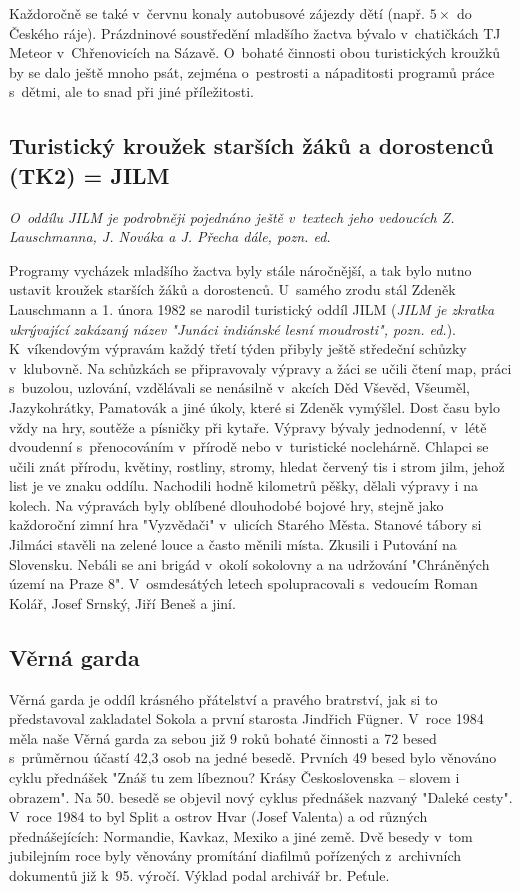 \documentclass[a5paper, 11pt, twoside]{article}
\newcommand{\pozned}[1]{%
\textit{#1}}
\begin{document}
Každoročně se také v~červnu konaly autobusové zájezdy dětí (např. \(5\times\) do
Českého ráje). Prázdninové soustředění mladšího žactva bývalo
v~chatičkách TJ Meteor v~Chřenovicích na Sázavě. O~bohaté činnosti obou
turistických kroužků by se dalo ještě mnoho psát, zejména o~pestrosti a
nápaditosti programů práce s~dětmi, ale to snad při jiné příležitosti.

\subsection{Turistický kroužek starších žáků a dorostenců (TK2) =
JILM}

\pozned{O~oddílu JILM je podrobněji pojednáno ještě v~textech jeho
vedoucích Z. Lauschmanna, J. Nováka a J. Přecha dále, pozn. ed.}

Programy vycházek mladšího žactva byly stále náročnější, a tak bylo
nutno ustavit kroužek starších žáků a dorostenců. U~samého zrodu stál
Zdeněk Lauschmann a 1. února 1982 se narodil turistický oddíl JILM
(\textit{JILM je zkratka ukrývající zakázaný název "Junáci indiánské lesní moudrosti", pozn. ed.}). K~víkendovým výpravám každý třetí týden
přibyly ještě středeční schůzky v~klubovně. Na schůzkách se připravovaly
výpravy a žáci se učili čtení map, práci s~buzolou, uzlování, vzdělávali
se nenásilně v~akcích Děd Vševěd, Všeuměl, Jazykohrátky, Pamatovák a
jiné úkoly, které si Zdeněk vymýšlel. Dost času bylo vždy na hry,
soutěže a písničky při kytaře. Výpravy bývaly jednodenní, v~létě
dvoudenní s~přenocováním v~přírodě nebo v~turistické noclehárně. Chlapci
se učili znát přírodu, květiny, rostliny, stromy, hledat červený tis i
strom jilm, jehož list je ve znaku oddílu. Nachodili hodně kilometrů
pěšky, dělali výpravy i na kolech. Na výpravách byly oblíbené dlouhodobé
bojové hry, stejně jako každoroční zimní hra "Vyzvědači" v~ulicích
Starého Města. Stanové tábory si Jilmáci stavěli na zelené louce a často
měnili místa. Zkusili i Putování na Slovensku. Nebáli se ani brigád
v~okolí sokolovny a na udržování "Chráněných území na Praze 8".
V~osmdesátých letech spolupracovali s~vedoucím Roman Kolář, Josef Srnský,
Jiří Beneš a jiní.

\subsection{Věrná garda}

Věrná garda je oddíl krásného přátelství a pravého bratrství, jak si to
představoval zakladatel Sokola a první starosta Jindřich Fügner. V~roce
1984 měla naše Věrná garda za sebou již 9 roků bohaté činnosti a 72
besed s~průměrnou účastí 42,3 osob na jedné besedě. Prvních 49 besed
bylo věnováno cyklu přednášek "Znáš tu zem líbeznou? Krásy
Československa -- slovem i obrazem". Na 50. besedě se objevil nový
cyklus přednášek nazvaný "Daleké cesty". V~roce 1984 to byl Split a
ostrov Hvar (Josef Valenta) a od různých přednášejících: Normandie,
Kavkaz, Mexiko a jiné země. Dvě besedy v~tom jubilejním roce byly
věnovány promítání diafilmů pořízených z~archivních dokumentů již k~95.
výročí. Výklad podal archivář br. Peťule.
\end{document}
